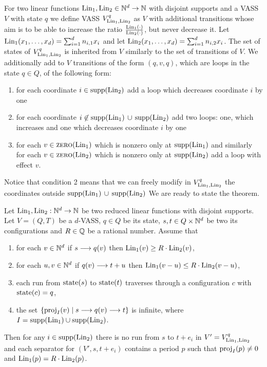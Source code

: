 For two linear functions $\textup{Lin}_1, \textup{Lin}_2 \in \mathbb{N}^d \to \mathbb{N}$ with disjoint supports
and a VASS $V$ with state $q$ we define VASS $V^q_{\textup{Lin}_1, \textup{Lin}_2}$
as $V$ with additional transitions whose aim is to be able to increase the ratio $\frac{\textup{Lin}_1(\cdot)}{\textup{Lin}_2(\cdot)}$,
but never decrease it.
Let $\textup{Lin}_1(x_1, \ldots, x_d) = \sum_{i=1}^d n_{i,1} x_i$ and let $\textup{Lin}_2(x_1, \ldots, x_d) = \sum_{i=1}^d n_{i,2} x_i$.
The set of states of $V^q_{\textup{Lin}_1, \textup{Lin}_2}$ is inherited from $V$ similarly to the set of transitions of $V$.
We additionally add to $V$ transitions of the form $(q, v, q)$, which are loops in the state $q \in Q$, of the following form:
\begin{enumerate}
  \item for each coordinate $i \in \textup{supp}(\textup{Lin}_2)$ add a loop which decreases coordinate $i$ by one
  \item for each coordinate $i \not\in \textup{supp}(\textup{Lin}_1) \, \cup \, \textup{supp}(\textup{Lin}_2)$ add two loops: one, which increases
  and one which decreases coordinate $i$ by one
  \item for each $v \in \textsc{zero}(\textup{Lin}_1)$ which is nonzero only at $\textup{supp}(\textup{Lin}_1)$
  and similarly for each $v \in \textsc{zero}(\textup{Lin}_2)$ which is nonzero only at $\textup{supp}(\textup{Lin}_2)$ add a loop with effect $v$. 
\end{enumerate}

Notice that condition 2 means that we can freely modify in $V^q_{\textup{Lin}_1, \textup{Lin}_2}$ the coordinates outside $\textup{supp}(\textup{Lin}_1) \, \cup \, \textup{supp}(\textup{Lin}_2)$
We are ready to state the theorem.

\begin{theorem}\label{thm:advanced}
Let $\textup{Lin}_1, \textup{Lin}_2: \mathbb{N}^d \to \mathbb{N}$ be two reduced linear functions with disjoint supports.
Let $V = (Q, T)$ be a $d$-VASS, $q \in Q$ be its state, $s, t \in Q \times \mathbb{N}^d$ be two its configurations
and $R \in \mathbb{Q}$ be a rational number.
Assume that
\begin{enumerate}[(1)]
  \item for each $v \in \mathbb{N}^d$ if $s \longrightarrow q(v)$ then $\textup{Lin}_1(v) \geq R \cdot \textup{Lin}_2(v)$,
  \item for each $u, v \in \mathbb{N}^d$ if $q(v) \longrightarrow t+u$ then $\textup{Lin}_1(v-u) \leq R \cdot \textup{Lin}_2(v-u)$,
  \item each run from $\textup{state}(s)$ to $\textup{state}(t)$ traverses through a configuration $c$ with $\textup{state}(c) = q$,
  \item the set $\{\textup{proj}_I(v) \mid s \longrightarrow q(v) \longrightarrow t\}$ is infinite, where $I = \textup{supp}(\textup{Lin}_1) \cup \textup{supp}(\textup{Lin}_2)$.
\end{enumerate}
Then for any $i \in \textup{supp}(\textup{Lin}_2)$ there is no run from $s$ to $t+e_i$ in $V' = V^q_{\textup{Lin}_1, \textup{Lin}_2}$ and each
separator for $(V', s, t+e_i)$ contains a period $p$ such that $\textup{proj}_I(p) \neq 0$ and $\textup{Lin}_1(p) = R \cdot \textup{Lin}_2(p)$.
\end{theorem}

